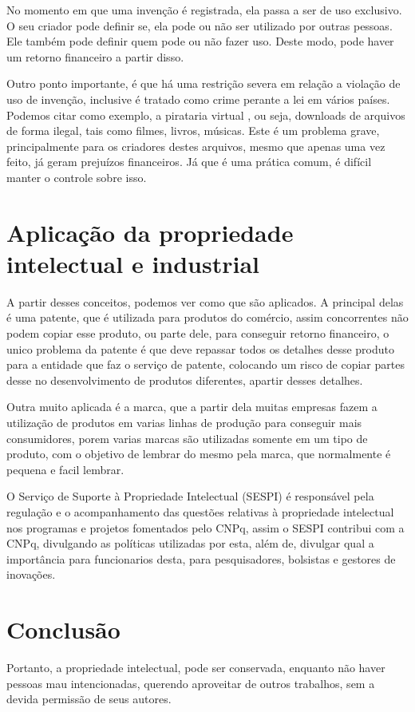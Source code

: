 \documentclass[12pt]{article}
\begin{document}
No momento em que uma invenção é registrada, ela passa a ser de uso exclusivo. O seu criador pode definir se, ela pode ou não ser utilizado por outras pessoas. Ele também pode definir quem pode ou não fazer uso. Deste modo, pode haver um retorno financeiro a partir disso.

Outro ponto importante, é que há uma restrição severa em relação a violação de uso de invenção, inclusive é tratado como crime perante a lei em vários países. Podemos citar como exemplo, a pirataria virtual \cite{PIRATE}, ou seja, downloads de arquivos de forma ilegal, tais como filmes, livros, músicas. Este é um problema grave, principalmente para os criadores destes arquivos, mesmo que apenas uma vez feito, já geram prejuízos financeiros. Já que é uma prática comum, é difícil manter o controle sobre isso.

\section{Aplicação da propriedade intelectual e industrial} \label{sec:aplicacao}

A partir desses conceitos, podemos ver como que são aplicados.
A principal delas é uma patente, que é utilizada para produtos do comércio,
assim concorrentes não podem copiar esse produto, ou parte dele, para conseguir retorno
financeiro, o unico problema da patente é que deve repassar todos os detalhes desse produto
para a entidade que faz o serviço de patente, colocando um risco de copiar partes desse
no desenvolvimento de produtos diferentes, apartir desses detalhes.

Outra muito aplicada é a marca, que a partir dela muitas empresas fazem a utilização de
produtos em varias linhas de produção para conseguir mais consumidores, porem varias marcas
são utilizadas somente em um tipo de produto, com o objetivo de lembrar do mesmo pela marca,
que normalmente é pequena e facil lembrar.

O Serviço de Suporte à Propriedade Intelectual (SESPI) é responsável pela regulação e o acompanhamento das questões relativas à propriedade intelectual nos programas e projetos fomentados pelo CNPq\cite{CNPQ}, assim o SESPI contribui com a CNPq, divulgando as políticas
utilizadas por esta, além de, divulgar qual a importância para funcionarios desta, para pesquisadores, bolsistas e gestores de inovações.

\section{Conclusão}\label{sec:conclusao}
Portanto, a propriedade intelectual, pode ser conservada, enquanto não haver pessoas mau intencionadas, querendo aproveitar de outros trabalhos, sem a devida permissão de seus autores.



\end{document}

